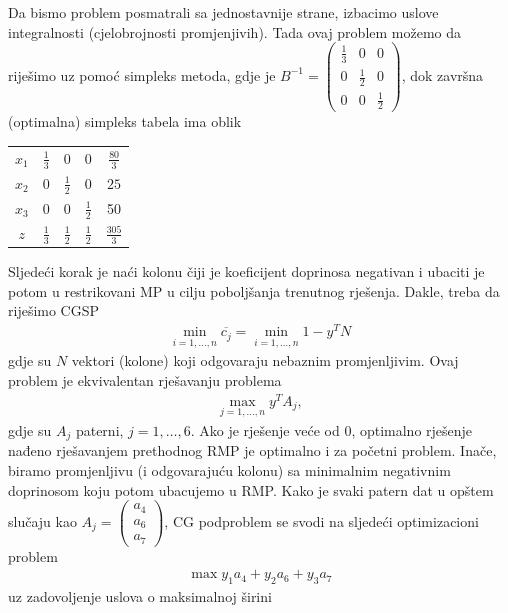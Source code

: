 \documentclass[a4paper, utf8, 11pt, colorlinks]{book}
\theoremstyle{definition}
\begin{document}
Da bismo  problem posmatrali sa jednostavnije strane, izbacimo uslove integralnosti (cjelobrojnosti promjenjivih). Tada ovaj problem možemo da riješimo uz pomoć simpleks metoda, gdje je 
$B^{-1} =\begin{pmatrix}
	    \frac{1}{3} & 0 & 0 \\
	    0 & \frac{1}{2} & 0  \\
	    0 &   0 & \frac{1}{2}
\end{pmatrix}$, dok završna (optimalna) simpleks tabela ima oblik 

\begin{center}
 
\begin{tabular}{cccc|c}
	  $x_1$ &     $\frac{1}{3}$  &   0 & 0  & $\frac{80}{3}$ \\
	  $x_2$ &     0              &  $\frac{1}{2}$  & 0 & $25$ \\
	  $x_3$ &     0              &  0    &  $\frac{1}{2}$  & 50 \\ \hline
	  $z$   &  $\frac{1}{3}$     &  $\frac{1}{2}$   &  $\frac{1}{2}$ & $\frac{305}{3}$ 
\end{tabular}
\end{center}
Sljedeći korak je naći kolonu čiji je koeficijent doprinosa negativan i ubaciti je potom u restrikovani MP u cilju poboljšanja trenutnog rješenja. Dakle, treba da riješimo CGSP
\begin{align}
	\min_{i=1,\ldots,n} \overline{c_j} = \min_{i=1,\ldots,n} 1 - y^T N
\end{align}
gdje su $N$ vektori (kolone) koji odgovaraju nebaznim promjenljivim. Ovaj problem je ekvivalentan rješavanju problema
\begin{align}
	\max_{j=1,\ldots,n} y^T A_j,
\end{align}
gdje su $A_j$ paterni, $j=1,\ldots, 6$. 
Ako je rješenje veće od 0, optimalno rješenje nađeno rješavanjem prethodnog RMP je optimalno i za početni problem. Inače, biramo promjenljivu (i odgovarajuću kolonu) sa minimalnim negativnim doprinosom koju potom ubacujemo u RMP. Kako je svaki patern dat u opštem slučaju kao $A_j = \begin{pmatrix}
	a_4 \\
	a_6 \\
	a_7
\end{pmatrix}$, CG podproblem se svodi na sljedeći optimizacioni problem
\begin{align}
	 \max y_1 a_4 + y_2 a_6 + y_3 a_7  
\end{align}
uz zadovoljenje uslova o maksimalnoj širini
\end{document}

